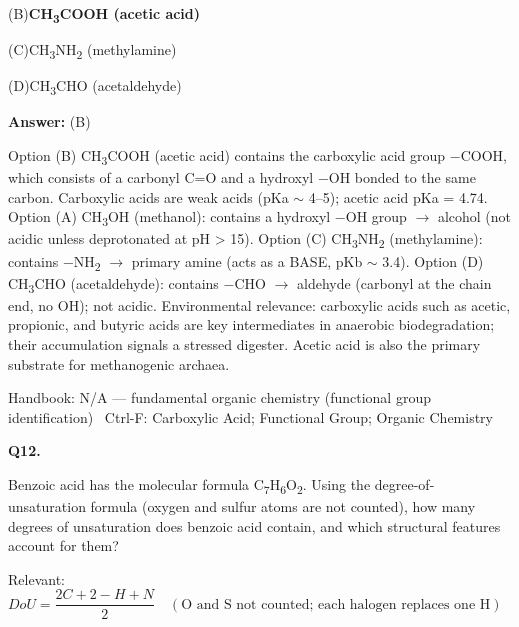 \documentclass[11pt]{article}
\newcommand{\correct}[1]{\textbf{#1}\;{\color{accent}$\checkmark$}}
\newcommand{\optline}[2]{\par\noindent\hspace{1.2em}(#1)\hspace{0.6em}#2}
\begin{document}
\optline{B}{\correct{CH\textsubscript{3}COOH  (acetic acid)}}
\optline{C}{CH\textsubscript{3}NH\textsubscript{2}  (methylamine)}
\optline{D}{CH\textsubscript{3}CHO  (acetaldehyde)}
\par\vspace{3pt}
\vspace{2pt}\par\noindent\colorbox{boxbg}{\parbox{\dimexpr\linewidth-2\fboxsep\relax}{%
\vspace{2pt}\textbf{Answer:} (B)\par\vspace{2pt}
{\small Option (B) CH\textsubscript{3}COOH (acetic acid) contains the carboxylic acid group $-$COOH, which consists of a carbonyl C=O and a hydroxyl $-$OH bonded to the same carbon. Carboxylic acids are weak acids (pKa $\sim$ 4--5); acetic acid pKa = 4.74. Option (A) CH\textsubscript{3}OH (methanol): contains a hydroxyl $-$OH group $\rightarrow$ alcohol (not acidic unless deprotonated at pH > 15). Option (C) CH\textsubscript{3}NH\textsubscript{2} (methylamine): contains $-$NH\textsubscript{2} $\rightarrow$ primary amine (acts as a BASE, pKb $\sim$ 3.4). Option (D) CH\textsubscript{3}CHO (acetaldehyde): contains $-$CHO $\rightarrow$ aldehyde (carbonyl at the chain end, no OH); not acidic. Environmental relevance: carboxylic acids such as acetic, propionic, and butyric acids are key intermediates in anaerobic biodegradation; their accumulation signals a stressed digester. Acetic acid is also the primary substrate for methanogenic archaea.}\par\vspace{2pt}
{\footnotesize\color{soft}Handbook: N/A --- fundamental organic chemistry (functional group identification) \textbullet\ Ctrl-F: Carboxylic Acid; Functional Group; Organic Chemistry}\vspace{2pt}
}}
\vspace{9pt}
\filbreak
\textbf{\color{accent}Q12.}\par\vspace{2pt}
Benzoic acid has the molecular formula C\textsubscript{7}H\textsubscript{6}O\textsubscript{2}. Using the degree-of-unsaturation formula (oxygen and sulfur atoms are not counted), how many degrees of unsaturation does benzoic acid contain, and which structural features account for them?\par\vspace{3pt}
{\small\color{soft}Relevant:}\ $DoU = \dfrac{2C + 2 - H + N}{2}\quad (\text{O and S not counted; each halogen replaces one H})$\par\vspace{3pt}
\end{document}
